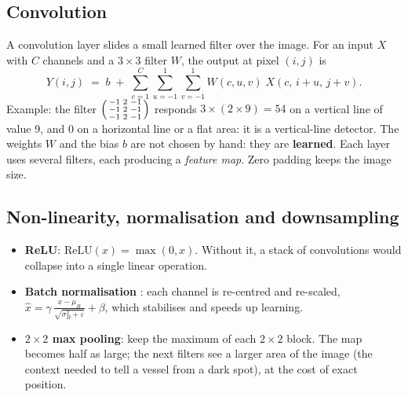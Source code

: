 \documentclass[11pt,a4paper]{article}
\begin{document}
\subsection{Convolution}
A convolution layer slides a small learned filter over the image. For an input $X$ with $C$ channels and a $3\times3$ filter $W$, the output at pixel $(i,j)$ is
\begin{equation}
Y(i,j) \;=\; b \;+\; \sum_{c=1}^{C}\sum_{u=-1}^{1}\sum_{v=-1}^{1} W(c,u,v)\; X(c,\,i+u,\,j+v).
\end{equation}
Example: the filter $\begin{psmallmatrix}-1&2&-1\\-1&2&-1\\-1&2&-1\end{psmallmatrix}$ responds $3\times(2\times9)=54$ on a vertical line of value 9, and $0$ on a horizontal line or a flat area: it is a vertical-line detector. The weights $W$ and the bias $b$ are not chosen by hand: they are \textbf{learned}. Each layer uses several filters, each producing a \emph{feature map}. Zero padding keeps the image size.

\subsection{Non-linearity, normalisation and downsampling}
\begin{itemize}
  \item \textbf{ReLU}: $\mathrm{ReLU}(x)=\max(0,x)$. Without it, a stack of convolutions would collapse into a single linear operation.
  \item \textbf{Batch normalisation} \cite{bn}: each channel is re-centred and re-scaled,
  $\hat{x} = \gamma\,\frac{x-\mu_B}{\sqrt{\sigma_B^2+\varepsilon}} + \beta$, which stabilises and speeds up learning.
  \item \textbf{$2\times2$ max pooling}: keep the maximum of each $2\times2$ block. The map becomes half as large; the next filters see a larger area of the image (the context needed to tell a vessel from a dark spot), at the cost of exact position.
\end{itemize}
\end{document}
